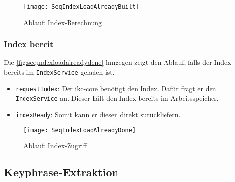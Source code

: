     \begin{figure}[H]
    \centering
    \texttt{[image: SeqIndexLoadAlreadyBuilt]}
    \caption{Ablauf: Index-Berechnung}
    \label{fig:seqindexalreadybuilt}
    \end{figure}
    
    
    
\subsubsection{Index bereit}



Die \autoref{fig:seqindexloadalreadydone} hingegen zeigt den Ablauf, falls der Index bereits im \texttt{IndexService} geladen ist.

\begin{itemize}
    \item \texttt{requestIndex}: Der \gls{ikc-core} benötigt den Index. Dafür fragt er den \texttt{IndexService} an. Dieser hält den Index bereits im Ar\-beits\-spei\-cher.
    \item \texttt{indexReady}: Somit kann er diesen direkt zurückliefern.
\end{itemize}
    
    \begin{figure}[H]
    \centering
    \texttt{[image: SeqIndexLoadAlreadyDone]}
    \caption{Ablauf: Index-Zugriff}
    \label{fig:seqindexloadalreadydone}
    \end{figure}

 
     
\subsection{Keyphrase-Extraktion}



